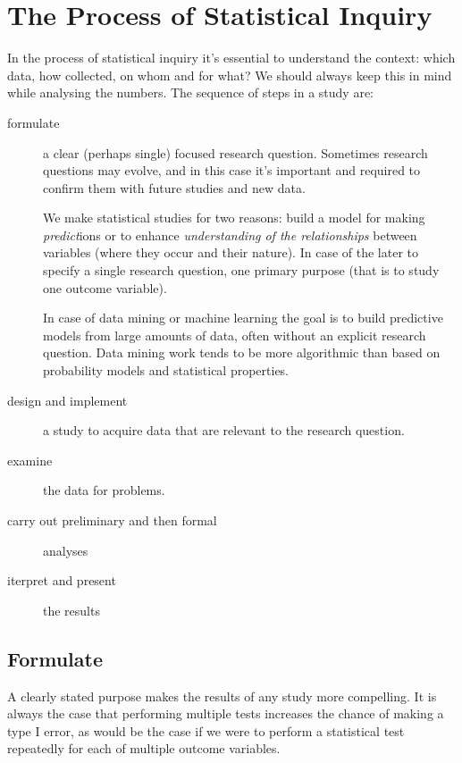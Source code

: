 \chapter*{The Process of Statistical Inquiry}

\setcounter{section}{0}
\renewcommand*{\theHsection}{ch8.\the\value{section}}

In the process of statistical inquiry it's essential to understand the  context:
which data, how collected, on whom and for what? We should always keep this in
mind while analysing the numbers. The sequence of steps in a study are:

\begin{description}
  \item[formulate] a clear (perhaps single) focused research question. Sometimes
  research questions may evolve, and in this case it's important and required to
  confirm them with future studies and new data. 
  
  We make statistical studies for two reasons: build a model for making
  \emph{predict}ions or to enhance \emph{understanding of the relationships}
  between variables (where they occur and their nature). In case of the later to
  specify a single research question, one primary purpose (that is to study one
  outcome variable).
  
  In case of data mining or machine learning the goal is to build predictive
  models from large amounts of data, often without an explicit research
  question. Data mining work tends to be more algorithmic than based on
  probability models and statistical properties.
  \item[design and implement] a study to acquire data that are relevant to the
  research question.
  \item[examine] the data for problems.
  \item[carry out preliminary and then formal] analyses
  \item[iterpret and present] the results
\end{description}

\section{Formulate}

A clearly stated purpose makes the results of any study more compelling. It is
always the case that performing multiple tests increases the chance of making a
type I error, as would be the case if we were to perform a statistical test
repeatedly for each of multiple outcome variables.

